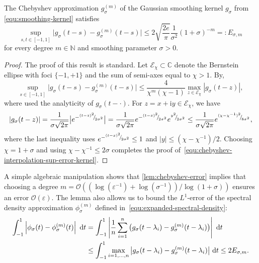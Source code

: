 \begin{lemma}\label{lem:chebyshev-error}
    The Chebyshev approximation $g_{\sigma}^{(m)}$ of the Gaussian smoothing kernel $g_{{\sigma}}$ from  \cref{equ:smoothing-kernel} satisfies
    \begin{equation}
        \sup_{s,t \in [-1, 1]} \big| g_{\sigma}(t - s) - g_{\sigma}^{(m)}(t - s) \big| \leq 2\sqrt{\frac{2e}{\pi}} \frac{1}{\sigma^2} (1 + \sigma)^{-m} =: E_{\sigma, m}
        \label{equ:chebyshev-interpolation-sup-error-kernel}
    \end{equation}
    for every degree $m \in \mathbb{N}$ and smoothing parameter $\sigma > 0$.
\end{lemma}
\begin{proof}
    The proof of this result is standard. Let $\mathcal{E}_{\chi} \subset \mathbb{C}$ denote the Bernstein ellipse  with foci $\{-1, +1\}$ and the sum of semi-axes equal to $\chi > 1$. By\cite[Theorem 8.2]{trefethen-2020-approximation-theory},
    \begin{equation*}
        \sup_{s \in [-1, 1]} \big| g_{\sigma}(t - s) - g_{\sigma}^{(m)}(t - s) \big| \leq \frac{4}{\chi^m (\chi - 1)} \max_{z \in \mathcal{E}_{\chi}} |g_{\sigma}(t - z)|,
        \label{equ:bernstein-bound}
    \end{equation*}
    where used the analyticity of $g_{\sigma}(t- \cdot)$.
    For $z = x + \mathrm{i} y \in \mathcal{E}_{\chi}$, we have
    \begin{equation*}
    | g_{\sigma}(t - z) | 
    = \frac{1}{\sigma \sqrt{2 \pi}} \big| e^{-{}^{(t - z)^2}{\mskip -5mu/\mskip -3mu}_{2\sigma^2}} \big|
    = \frac{1}{\sigma \sqrt{2 \pi}} e^{-{}^{(t - x)^2}{\mskip -5mu/\mskip -3mu}_{2\sigma^2}}e^{{}^{y^2}{\mskip -5mu/\mskip -3mu}_{2\sigma^2}}
    \le \frac{1}{\sigma \sqrt{2 \pi}} e^{{}^{(\chi - \chi^{-1})^2}{\mskip -5mu/\mskip -3mu}_{8 \sigma^2}},
    \end{equation*}
    where the last inequality uses 
    $e^{-{}^{(t - x)^2}{\mskip -5mu/\mskip -3mu}_{2\sigma^2}} \leq 1$ and $|y| \le (\chi - \chi^{-1}) / 2$.
    Choosing $\chi = 1 + \sigma$ and using $\chi - \chi^{-1} \leq 2\sigma$ completes the proof of~\cref{equ:chebyshev-interpolation-sup-error-kernel}.
\end{proof}

A simple algebraic manipulation shows that \cref{lem:chebyshev-error} implies that choosing a degree $m = \mathcal{O}((\log(\varepsilon^{-1}) + \log(\sigma^{-1})) / \log(1 + \sigma))$ ensures an error $\mathcal{O}(\varepsilon)$. The lemma also allows us to bound the $L^1$-error of the spectral density approximation
$\phi_{\sigma}^{(m)}$ defined in~\cref{equ:expanded-spectral-density}:
\begin{align}
    \int_{-1}^{1} \left| \phi_{\sigma}(t) - \phi_{\sigma}^{(m)}(t) \right|~\mathrm{d}t 
    &= \int_{-1}^{1} \left| \frac{1}{n} \sum_{i=1}^n \big(g_{\sigma}(t - \lambda_i) - g_{\sigma}^{(m)}(t - \lambda_i)\big) \right|~\mathrm{d}t \notag \\
    &\leq \int_{-1}^{1} \max_{i = 1, \dots, n} \big| g_{\sigma}(t - \lambda_i) - g_{\sigma}^{(m)}(t - \lambda_i) \big|~\mathrm{d}t    \leq 2 E_{\sigma, m}.
    \label{equ:chebyshev-interpolation-spectral-density}
\end{align}

